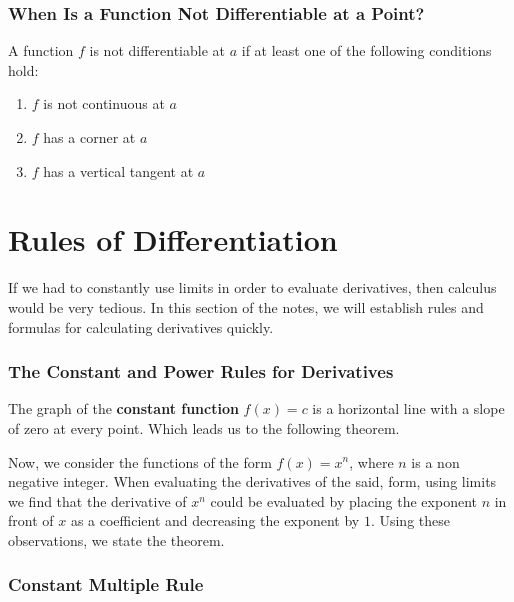 \documentclass{report}
\begin{document}

\subsubsection{When Is a Function Not Differentiable at a Point?}
A function $f$ is not differentiable at $a$ if at least one of the following conditions hold:

\begin{enumerate}
    \item $f$ is not continuous at $a$
    \item $f$ has a corner at $a$
    \item $f$ has a vertical tangent at $a$
\end{enumerate}


\newpage

\section{Rules of Differentiation}
If we had to constantly use limits in order to evaluate derivatives, then calculus would be very tedious. In this section of the notes, we will establish rules and formulas for calculating derivatives quickly.

\subsubsection{The Constant and Power Rules for Derivatives}
The graph of the \textbf{constant function} $f(x)=c$ is a horizontal line with a slope of zero at every point. Which leads us to the following theorem.


Now, we consider the functions of the form $f(x)=x^n$, where $n$ is a non negative integer. When evaluating the derivatives of the said, form, using limits we find that the derivative of $x^n$ could be evaluated by placing the exponent $n$ in front of $x$ as a coefficient and decreasing the exponent by $1$. Using these observations, we state the theorem. 


\subsubsection{Constant Multiple Rule}
\end{document}
